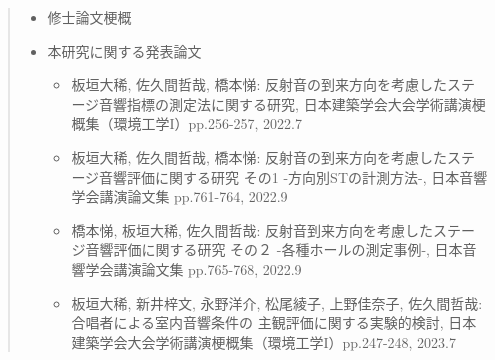 \documentclass[11pt,a4j,dvipdfmx, twoside]{jreport}
\begin{document}
\begin{quote}
  \begin{itemize}
    \item 修士論文梗概
    \item 本研究に関する発表論文
    \begin{itemize}
      \item 板垣大稀, 佐久間哲哉, 橋本悌: 反射音の到来方向を考慮したステージ音響指標の測定法に関する研究,
            日本建築学会大会学術講演梗概集（環境工学I）pp.256-257, 2022.7
      \item 板垣大稀, 佐久間哲哉, 橋本悌: 反射音の到来方向を考慮したステージ音響評価に関する研究 その1 
            -方向別STの計測方法-, 日本音響学会講演論文集 pp.761-764, 2022.9
      \item 橋本悌, 板垣大稀, 佐久間哲哉: 反射音到来方向を考慮したステージ音響評価に関する研究 その２ 
            -各種ホールの測定事例-, 日本音響学会講演論文集 pp.765-768, 2022.9
      \item 板垣大稀, 新井梓文, 永野洋介, 松尾綾子, 上野佳奈子, 佐久間哲哉: 合唱者による室内音響条件の
            主観評価に関する実験的検討, 日本建築学会大会学術講演梗概集（環境工学I）pp.247-248, 2023.7
    \end{itemize}
  \end{itemize}
 \end{quote}
\clearpage


\clearpage


\clearpage


\clearpage


\clearpage


\clearpage
\pagestyle{empty}

\renewcommand{\bibname}{参考文献} %
\end{document}
